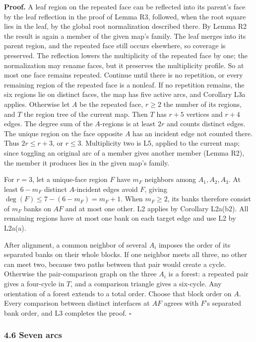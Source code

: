 \documentclass[
  11pt,
]{article}
\begin{document}
\textbf{Proof.} A leaf region on the repeated face can be reflected into
its parent's face by the leaf reflection in the proof of Lemma R3,
followed, when the root square lies in the leaf, by the global root
normalization described there. By Lemma R2 the result is again a member
of the given map's family. The leaf merges into its parent region, and
the repeated face still occurs elsewhere, so coverage is preserved. The
reflection lowers the multiplicity of the repeated face by one; the
normalization may rename faces, but it preserves the multiplicity
profile. So at most one face remains repeated. Continue until there is
no repetition, or every remaining region of the repeated face is a
nonleaf. If no repetition remains, the six regions lie on distinct
faces, the map has five active arcs, and Corollary L3a applies.
Otherwise let \(A\) be the repeated face, \(r\ge2\) the number of its
regions, and \(T\) the region tree of the current map. Then \(T\) has
\(r+5\) vertices and \(r+4\) edges. The degree sum of the \(A\)-regions
is at least \(2r\) and counts distinct edges. The unique region on the
face opposite \(A\) has an incident edge not counted there. Thus
\(2r\le r+3\), or \(r\le3\). Multiplicity two is L5, applied to the
current map; since toggling an original arc of a member gives another
member (Lemma R2), the member it produces lies in the given map's
family.

For \(r=3\), let a unique-face region \(F\) have \(m_F\) neighbors among
\(A_1,A_2,A_3\). At least \(6-m_F\) distinct \(A\)-incident edges avoid
\(F\), giving \(\deg(F)\le7-(6-m_F)=m_F+1\). When \(m_F\ge2\), its banks
therefore consist of \(m_F\) banks on \(AF\) and at most one other. L2
applies by Corollary L2a(b2). All remaining regions have at most one
bank on each target edge and use L2 by L2a(a).

After alignment, a common neighbor of several \(A_i\) imposes the order
of its separated banks on their whole blocks. If one neighbor meets all
three, no other can meet two, because two paths between that pair would
create a cycle. Otherwise the pair-comparison graph on the three \(A_i\)
is a forest: a repeated pair gives a four-cycle in \(T\), and a
comparison triangle gives a six-cycle. Any orientation of a forest
extends to a total order. Choose that block order on \(A\). Every
comparison between distinct interfaces at \(AF\) agrees with \(F\)'s
separated bank order, and L3 completes the proof. \(\square\)

\subsubsection{4.6 Seven arcs}\label{seven-arcs}
\end{document}
